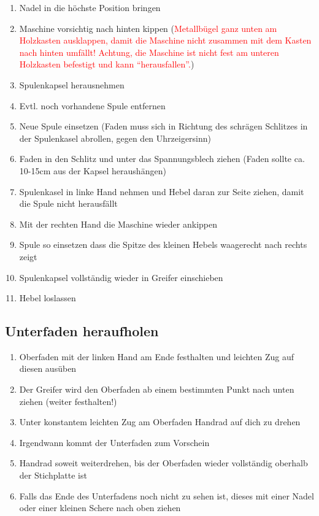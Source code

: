 \documentclass{\basedir/fablab-document}
\begin{document}
\vspace{1em}
\begin{enumerate}
 \item Nadel in die höchste Position bringen
 \item Maschine vorsichtig nach hinten kippen (\textcolor{red}{Metallbügel ganz unten am Holzkasten ausklappen, damit die Maschine nicht zusammen mit dem Kasten nach hinten umfällt! Achtung, die Maschine ist nicht fest am unteren Holzkasten befestigt und kann \enquote{herausfallen}.})
 \item Spulenkapsel herausnehmen
 \item Evtl. noch vorhandene Spule entfernen
 \item Neue Spule einsetzen (Faden muss sich in Richtung des schrägen Schlitzes in der Spulenkasel abrollen, gegen den Uhrzeigersinn)
 \item Faden in den Schlitz und unter das Spannungsblech ziehen (Faden sollte ca. 10-15cm aus der Kapsel heraushängen)
 \item Spulenkasel in linke Hand nehmen und Hebel daran zur Seite ziehen, damit die Spule nicht herausfällt
 \item Mit der rechten Hand die Maschine wieder ankippen
 \item Spule so einsetzen dass die Spitze des kleinen Hebels waagerecht nach rechts zeigt
 \item Spulenkapsel vollständig wieder in Greifer einschieben
 \item Hebel loslassen
\end{enumerate}


\subsection{Unterfaden heraufholen}
\begin{enumerate}
	\item Oberfaden mit der linken Hand am Ende festhalten und leichten Zug auf diesen ausüben
	\item Der Greifer wird den Oberfaden ab einem bestimmten Punkt nach unten ziehen (weiter festhalten!)
	\item Unter konstantem leichten Zug am Oberfaden Handrad auf dich zu drehen
	\item Irgendwann kommt der Unterfaden zum Vorschein
	\item Handrad soweit weiterdrehen, bis der Oberfaden wieder vollständig oberhalb der Stichplatte ist
	\item Falls das Ende des Unterfadens noch nicht zu sehen ist, dieses mit einer Nadel oder einer kleinen Schere nach oben ziehen
\end{enumerate}
\end{document}
